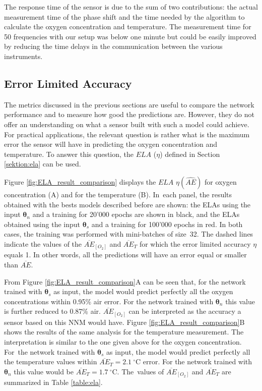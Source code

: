 \documentclass[sensors,article,accept,moreauthors,pdftex,10pt,a4paper]{Definitions/mdpi}
\begin{document}
The response time of the sensor is due to the sum of two contributions: the actual measurement time of the phase shift and the time needed by the algorithm to calculate the oxygen concentration and temperature. The measurement time for 50 frequencies with our setup was below one minute but could be easily improved by reducing the time delays in the communication between the various instruments.

\subsection{Error Limited Accuracy}

The metrics discussed in the previous sections are useful to compare the network performance and to measure how good the predictions are. However, they do not offer an understanding on what a sensor built with such a model could achieve. For practical applications, the relevant question is rather what is the maximum error  the sensor will have in predicting the oxygen concentration and temperature. To answer this question, the $ELA$ ($\eta$) defined in Section \ref{sektion:ela} can be used. 

Figure \ref{fig:ELA_result_comparison} displays the $ELA$ $\eta(\widehat {AE})$ for oxygen concentration (A) and for the temperature (B). In~each panel, the results obtained with the bests models described before are shown: the ELAs using the input ${\pmb \theta}_n$ and a training for 20'000 epochs are shown in black, and the ELAs obtained using the input ${\pmb \theta}_s$ and a training for 100'000 epochs in red. In both cases, the training was performed with mini-batches of size~32.
The dashed lines indicate the values of the $\overline{AE}_{[O_2]}$ and $\overline{AE}_{T}$ for which the error limited accuracy $\eta$ equals 1. In other words, all the predictions will have an error equal or smaller than $\overline{AE}$.



From Figure \ref{fig:ELA_result_comparison}A can be seen that, for the network trained with ${\pmb \theta}_s$ as input, the model would predict perfectly all the oxygen concentrations within 0.95\% air error. For the network trained with ${\pmb \theta}_n$ this value is further reduced to 0.87\% air. $\overline{AE}_{[O_2]}$ can be interpreted as the accuracy a sensor based on this NNM would have.
Figure \ref{fig:ELA_result_comparison}B shows the results of the same analysis for the temperature measurement. The interpretation is similar to the one given above for the oxygen concentration. For~the network trained with ${\pmb \theta}_s$ as input, the model would predict perfectly all the temperature values within $\overline{AE}_{T}=2.1 \ ^\circ$C error. For the network trained with ${\pmb \theta}_n$ this value would be  $\overline{AE}_{T}=1.7 \ ^\circ$C. The~values of $\overline{AE}_{[O_2]}$ and $\overline{AE}_{T}$ are summarized in Table \ref{table:ela}.
\end{document}
